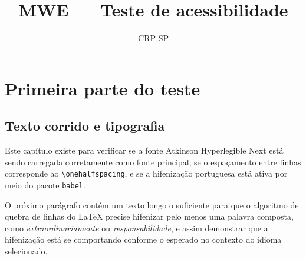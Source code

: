 \documentclass[11pt,a5paper,twoside,openright]{book}
\title{MWE — Teste de acessibilidade}
\author{CRP-SP}
\begin{document}
\frontmatter
\pagestyle{pretext}

\maketitle

\TOCAcessivel

\mainmatter
\pagestyle{crp}

\part{Primeira parte do teste}

\chapter{Texto corrido e tipografia}

Este capítulo existe para verificar se a fonte Atkinson Hyperlegible Next está sendo
carregada corretamente como fonte principal, se o espaçamento
entre linhas corresponde ao \texttt{\textbackslash onehalfspacing},
e se a hifenização portuguesa está ativa por meio do pacote
\texttt{babel}.

O próximo parágrafo contém um texto longo o suficiente para que
o algoritmo de quebra de linhas do \LaTeX{} precise hifenizar
pelo menos uma palavra composta, como
\emph{extraordinariamente} ou \emph{responsabilidade}, e assim
demonstrar que a hifenização está se comportando conforme o
esperado no contexto do idioma selecionado.
\end{document}
